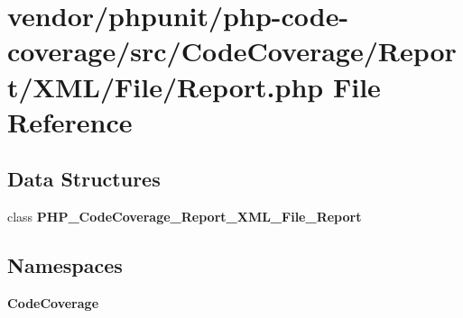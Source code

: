 \section{vendor/phpunit/php-\/code-\/coverage/src/\+Code\+Coverage/\+Report/\+X\+M\+L/\+File/\+Report.php File Reference}
\label{_report_8php}
\subsection*{Data Structures}
\begin{DoxyCompactItemize}
\item 
class {\bf P\+H\+P\+\_\+\+Code\+Coverage\+\_\+\+Report\+\_\+\+X\+M\+L\+\_\+\+File\+\_\+\+Report}
\end{DoxyCompactItemize}
\subsection*{Namespaces}
\begin{DoxyCompactItemize}
\item 
 {\bf Code\+Coverage}
\end{DoxyCompactItemize}
